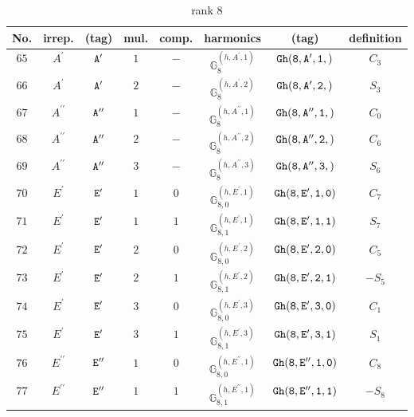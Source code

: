 \documentclass[fleqn,8pt]{jsarticle}
\begin{document}
\begin{table}[ht!]
\begin{center}
\caption{rank 8}
\renewcommand{\arraystretch}{1.3}
\begin{tabular}{cccccccc} \hline \hline
No. & irrep. & (tag) & mul. & comp. & harmonics & (tag) & definition \\ \hline
$ 65 $ & $ A^{\prime} $ & $ {\tt A'} $ & $ 1 $ & $ - $ & $ \mathbb{G}_{8}^{(h,A^{\prime},1)} $ & $ {\tt Gh(8,A',1,)} $ & $ C_{3} $ \\
$ 66 $ & $ A^{\prime} $ & $ {\tt A'} $ & $ 2 $ & $ - $ & $ \mathbb{G}_{8}^{(h,A^{\prime},2)} $ & $ {\tt Gh(8,A',2,)} $ & $ S_{3} $ \\
$ 67 $ & $ A^{\prime\prime} $ & $ {\tt A''} $ & $ 1 $ & $ - $ & $ \mathbb{G}_{8}^{(h,A^{\prime\prime},1)} $ & $ {\tt Gh(8,A'',1,)} $ & $ C_{0} $ \\
$ 68 $ & $ A^{\prime\prime} $ & $ {\tt A''} $ & $ 2 $ & $ - $ & $ \mathbb{G}_{8}^{(h,A^{\prime\prime},2)} $ & $ {\tt Gh(8,A'',2,)} $ & $ C_{6} $ \\
$ 69 $ & $ A^{\prime\prime} $ & $ {\tt A''} $ & $ 3 $ & $ - $ & $ \mathbb{G}_{8}^{(h,A^{\prime\prime},3)} $ & $ {\tt Gh(8,A'',3,)} $ & $ S_{6} $ \\
$ 70 $ & $ E^{\prime} $ & $ {\tt E'} $ & $ 1 $ & $ 0 $ & $ \mathbb{G}_{8,0}^{(h,E^{\prime},1)} $ & $ {\tt Gh(8,E',1,0)} $ & $ C_{7} $ \\
$ 71 $ & $ E^{\prime} $ & $ {\tt E'} $ & $ 1 $ & $ 1 $ & $ \mathbb{G}_{8,1}^{(h,E^{\prime},1)} $ & $ {\tt Gh(8,E',1,1)} $ & $ S_{7} $ \\
$ 72 $ & $ E^{\prime} $ & $ {\tt E'} $ & $ 2 $ & $ 0 $ & $ \mathbb{G}_{8,0}^{(h,E^{\prime},2)} $ & $ {\tt Gh(8,E',2,0)} $ & $ C_{5} $ \\
$ 73 $ & $ E^{\prime} $ & $ {\tt E'} $ & $ 2 $ & $ 1 $ & $ \mathbb{G}_{8,1}^{(h,E^{\prime},2)} $ & $ {\tt Gh(8,E',2,1)} $ & $ - S_{5} $ \\
$ 74 $ & $ E^{\prime} $ & $ {\tt E'} $ & $ 3 $ & $ 0 $ & $ \mathbb{G}_{8,0}^{(h,E^{\prime},3)} $ & $ {\tt Gh(8,E',3,0)} $ & $ C_{1} $ \\
$ 75 $ & $ E^{\prime} $ & $ {\tt E'} $ & $ 3 $ & $ 1 $ & $ \mathbb{G}_{8,1}^{(h,E^{\prime},3)} $ & $ {\tt Gh(8,E',3,1)} $ & $ S_{1} $ \\
$ 76 $ & $ E^{\prime\prime} $ & $ {\tt E''} $ & $ 1 $ & $ 0 $ & $ \mathbb{G}_{8,0}^{(h,E^{\prime\prime},1)} $ & $ {\tt Gh(8,E'',1,0)} $ & $ C_{8} $ \\
$ 77 $ & $ E^{\prime\prime} $ & $ {\tt E''} $ & $ 1 $ & $ 1 $ & $ \mathbb{G}_{8,1}^{(h,E^{\prime\prime},1)} $ & $ {\tt Gh(8,E'',1,1)} $ & $ - S_{8} $ \\

\end{tabular}
\end{center}
\end{table}
\end{document}
